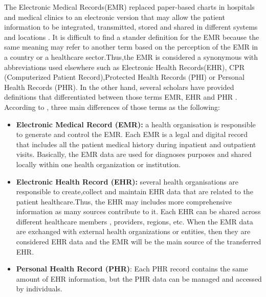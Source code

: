 The  Electronic Medical Records(EMR) replaced paper-based charts in hospitals and medical clinics to an electronic version that may allow the patient information to be integrated, transmitted, stored and shared in different systems and locations \cite{Rahim2016}. It is difficult to find a stander definition for the EMR because the same meaning may refer to another term based on the perception of the EMR in a country or a healthcare sector.Thus,the EMR is considered a synonymous with abbreviations used elsewhere such as  Electronic Health Records(EHR)\cite{WorldHealthOrganization2016,Rahim2016,}, CPR (Computerized Patient Record),Protected Health Records (PHI) or Personal Health Records (PHR). In the other hand, several scholars have provided definitions that differentiated between those terms EMR, EHR and PHR \cite{Kierkegaard2011,Deutsch2010} . According to \cite{Yang2015,U.S.DepartmentofHealthandHumanServices2015}, three main differences of those terms  as the following:
\begin{itemize}
	\item\textbf{ Electronic Medical Record (EMR):} a health organisation is responsible to generate and control the EMR. Each EMR is a legal and digital record that includes all the patient medical history  during inpatient and outpatient visits. Basically, the EMR data are used for diagnoses purposes and shared locally within one health organization or institution\cite{Yang2015}. 
	\item \textbf{Electronic Health Record (EHR):} several health organisations are responsible to create,collect and maintain EHR data that are related to the patient healthcare.Thus, the EHR  may includes more comprehensive information as many sources contribute to it. Each EHR can be shared across different healthcare members , providers, regions, etc. When the EMR data are exchanged with external health organizations or entities, then they are considered EHR data and the EMR will be the main source of the transferred EHR\cite{Yang2015}.  
	\item \textbf{Personal Health Record (PHR)}: Each PHR record contains the same amount of EHR information, but the PHR data can be managed and accessed by individuals\cite{Yang2015,U.S.DepartmentofHealthandHumanServices2015}.
\end{itemize}


